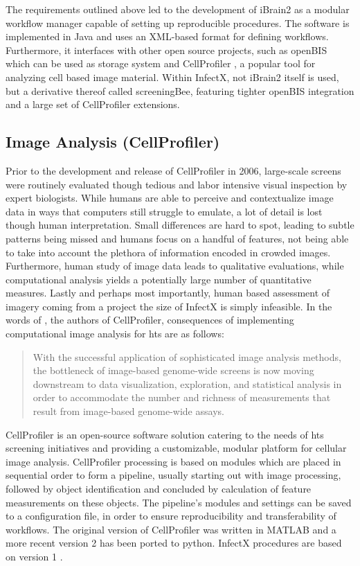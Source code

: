 The requirements outlined above led to the development of iBrain2 as a modular workflow manager capable of setting up reproducible procedures. The software is implemented in Java and uses an XML-based format for defining workflows. Furthermore, it interfaces with other open source projects, such as openBIS \citep{Bauch2011} which can be used as storage system and CellProfiler \citep{Carpenter2006,Kamentsky2011}, a popular tool for analyzing cell based image material. Within InfectX, not iBrain2 itself is used, but a derivative thereof called screeningBee, featuring tighter openBIS integration and a large set of CellProfiler extensions.

\subsection{Image Analysis (CellProfiler)}
Prior to the development and release of CellProfiler in 2006, large-scale screens were routinely evaluated though tedious and labor intensive visual inspection by expert biologists. While humans are able to perceive and contextualize image data in ways that computers still struggle to emulate, a lot of detail is lost though human interpretation. Small differences are hard to spot, leading to subtle patterns being missed and humans focus on a handful of features, not being able to take into account the plethora of information encoded in crowded images. Furthermore, human study of image data leads to qualitative evaluations, while computational analysis yields a potentially large number of quantitative measures. Lastly and perhaps most importantly, human based assessment of imagery coming from a project the size of InfectX is simply infeasible. In the words of \citeauthor{Carpenter2006}, the authors of CellProfiler, consequences of implementing computational image analysis for \gls{hts} are as follows:

\begin{quote}
With the successful application of sophisticated image analysis methods, the bottleneck of image-based genome-wide screens is now moving downstream to data visualization, exploration, and statistical analysis in order to accommodate the number and richness of measurements that result from image-based genome-wide assays.
\end{quote}

CellProfiler is an open-source software solution catering to the needs of \gls{hts} screening initiatives and providing a customizable, modular platform for cellular image analysis. CellProfiler processing is based on modules which are placed in sequential order to form a pipeline, usually starting out with image processing, followed by object identification and concluded by calculation of feature measurements on these objects. The pipeline's modules and settings can be saved to a configuration file, in order to ensure reproducibility and transferability of workflows. The original version of CellProfiler was written in MATLAB and a more recent version 2 has been ported to python. InfectX procedures are based on version 1 \citep{Carpenter2006}.

